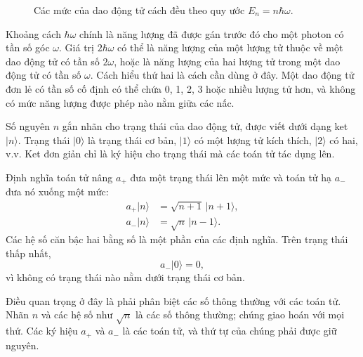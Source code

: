 \begin{figure}[t]
\centering
{}
\caption{Các mức của dao động tử cách đều theo quy ước \(E_n=n\hbar\omega\).}
\end{figure}

Khoảng cách \(\hbar\omega\) chính là năng lượng đã được gán trước đó cho một photon có tần số góc \(\omega\). Giá trị \(2\hbar\omega\) có thể là năng lượng của một lượng tử thuộc về một dao động tử có tần số \(2\omega\), hoặc là năng lượng của hai lượng tử trong một dao động tử có tần số \(\omega\). Cách hiểu thứ hai là cách cần dùng ở đây. Một dao động tử đơn lẻ có tần số cố định có thể chứa 0, 1, 2, 3 hoặc nhiều lượng tử hơn, và không có mức năng lượng được phép nào nằm giữa các nấc.

Số nguyên \(n\) gắn nhãn cho trạng thái của dao động tử, được viết dưới dạng ket \(|n\rangle\). Trạng thái \(|0\rangle\) là trạng thái cơ bản, \(|1\rangle\) có một lượng tử kích thích, \(|2\rangle\) có hai, v.v. Ket đơn giản chỉ là ký hiệu cho trạng thái mà các toán tử tác dụng lên.

Định nghĩa toán tử nâng \(a_+\) đưa một trạng thái lên một mức và toán tử hạ \(a_-\) đưa nó xuống một mức:
\begin{align}
a_+|n\rangle &= \sqrt{n+1}\,|n+1\rangle,\\
a_-|n\rangle &= \sqrt{n}\,|n-1\rangle.
\end{align}
Các hệ số căn bậc hai bằng số là một phần của các định nghĩa. Trên trạng thái thấp nhất,
\begin{equation}
a_-|0\rangle=0,
\end{equation}
vì không có trạng thái nào nằm dưới trạng thái cơ bản.

Điều quan trọng ở đây là phải phân biệt các số thông thường với các toán tử. Nhãn \(n\) và các hệ số như \(\sqrt n\) là các số thông thường; chúng giao hoán với mọi thứ. Các ký hiệu \(a_+\) và \(a_-\) là các toán tử, và thứ tự của chúng phải được giữ nguyên.

